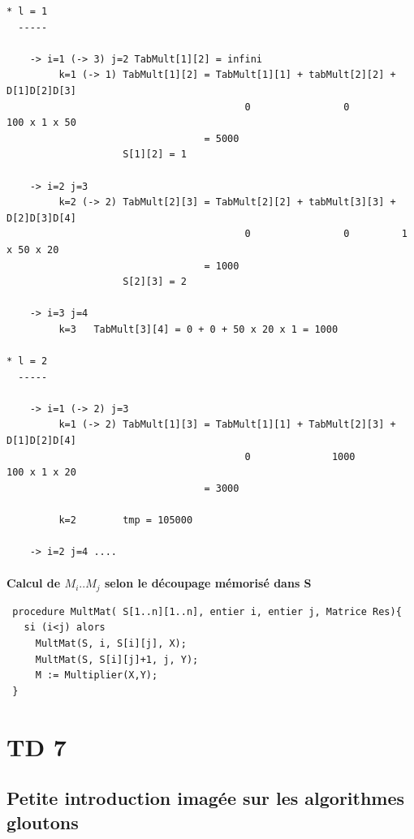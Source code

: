 \begin{verbatim}
* l = 1
  -----

    -> i=1 (-> 3) j=2 TabMult[1][2] = infini
         k=1 (-> 1) TabMult[1][2] = TabMult[1][1] + tabMult[2][2] + D[1]D[2]D[3]
                                         0                0         100 x 1 x 50
                                  = 5000
                    S[1][2] = 1 

    -> i=2 j=3
         k=2 (-> 2) TabMult[2][3] = TabMult[2][2] + tabMult[3][3] + D[2]D[3]D[4]
                                         0                0         1 x 50 x 20
                                  = 1000
                    S[2][3] = 2

    -> i=3 j=4
         k=3   TabMult[3][4] = 0 + 0 + 50 x 20 x 1 = 1000

* l = 2 
  -----

    -> i=1 (-> 2) j=3
         k=1 (-> 2) TabMult[1][3] = TabMult[1][1] + TabMult[2][3] + D[1]D[2]D[4]
                                         0              1000        100 x 1 x 20
                                  = 3000

         k=2        tmp = 105000

    -> i=2 j=4 ....
\end{verbatim}

\paragraph{}
\textbf{Calcul de $M_i..M_j$ selon le découpage mémorisé dans S}

\begin{verbatim}
 procedure MultMat( S[1..n][1..n], entier i, entier j, Matrice Res){
   si (i<j) alors
     MultMat(S, i, S[i][j], X);
     MultMat(S, S[i][j]+1, j, Y);
     M := Multiplier(X,Y);
 }
\end{verbatim}

\section{TD 7}

\subsection{Petite introduction imagée sur les algorithmes gloutons}

